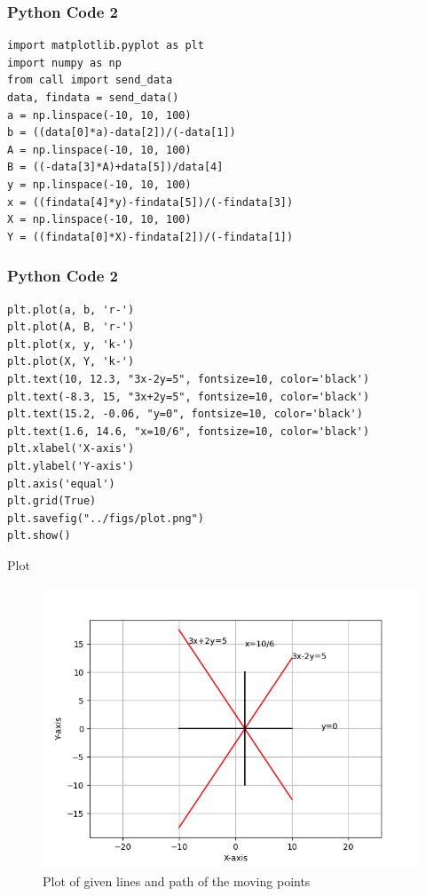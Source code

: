 \documentclass{beamer}
\begin{document}
\begin{frame}[fragile]
    \frametitle{Python Code 2}
    \begin{lstlisting}
import matplotlib.pyplot as plt
import numpy as np
from call import send_data
data, findata = send_data()
a = np.linspace(-10, 10, 100)
b = ((data[0]*a)-data[2])/(-data[1])
A = np.linspace(-10, 10, 100)
B = ((-data[3]*A)+data[5])/data[4]
y = np.linspace(-10, 10, 100)
x = ((findata[4]*y)-findata[5])/(-findata[3])
X = np.linspace(-10, 10, 100)
Y = ((findata[0]*X)-findata[2])/(-findata[1])
    \end{lstlisting}
\end{frame}

\begin{frame}[fragile]
    \frametitle{Python Code 2}
    \begin{lstlisting}
plt.plot(a, b, 'r-') 
plt.plot(A, B, 'r-')
plt.plot(x, y, 'k-')
plt.plot(X, Y, 'k-')
plt.text(10, 12.3, "3x-2y=5", fontsize=10, color='black')
plt.text(-8.3, 15, "3x+2y=5", fontsize=10, color='black')
plt.text(15.2, -0.06, "y=0", fontsize=10, color='black')
plt.text(1.6, 14.6, "x=10/6", fontsize=10, color='black')
plt.xlabel('X-axis')
plt.ylabel('Y-axis')
plt.axis('equal')
plt.grid(True)
plt.savefig("../figs/plot.png")
plt.show()    \end{lstlisting}
\end{frame}

\begin{frame}{Plot}
    \begin{figure}
        \centering
        \includegraphics[width=0.5\columnwidth]{../figs/plot.png}
        \caption{Plot of given lines and path of the moving points}
        \label{fig:fig}
    \end{figure}
\end{frame}
\end{document}
